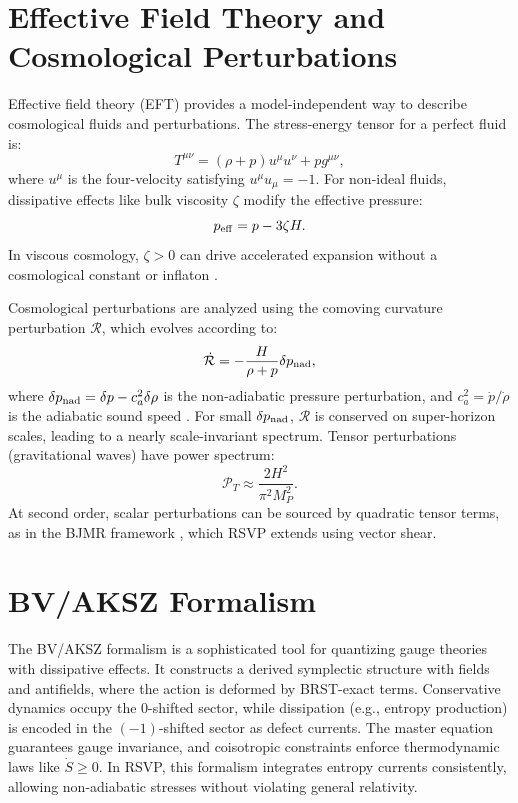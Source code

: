 \documentclass[12pt, a4paper, openany]{book}
\theoremstyle{definition}
\begin{document}
\section{Effective Field Theory and Cosmological Perturbations}
Effective field theory (EFT) provides a model-independent way to describe cosmological fluids and perturbations. The stress-energy tensor for a perfect fluid is:
\begin{equation}
T^{\mu\nu} = (\rho + p)u^\mu u^\nu + p g^{\mu\nu},
\end{equation}
where $u^\mu$ is the four-velocity satisfying $u^\mu u_\mu = -1$. For non-ideal fluids, dissipative effects like bulk viscosity $\zeta$ modify the effective pressure:
\begin{equation}
p_{\rm eff} = p - 3\zeta H.
\end{equation}
In viscous cosmology, $\zeta > 0$ can drive accelerated expansion without a cosmological constant or inflaton \citep{Coley:2009}.

Cosmological perturbations are analyzed using the comoving curvature perturbation $\mathcal{R}$, which evolves according to:
\begin{equation}
\dot{\mathcal{R}} = -\frac{H}{\rho + p} \delta p_{\rm nad},
\end{equation}
where $\delta p_{\rm nad} = \delta p - c_a^2 \delta \rho$ is the non-adiabatic pressure perturbation, and $c_a^2 = \dot{p}/\dot{\rho}$ is the adiabatic sound speed \citep{Malik:2009}. For small $\delta p_{\rm nad}$, $\mathcal{R}$ is conserved on super-horizon scales, leading to a nearly scale-invariant spectrum. Tensor perturbations (gravitational waves) have power spectrum:
\begin{equation}
\mathcal{P}_T \approx \frac{2 H^2}{\pi^2 M_P^2}.
\end{equation}
At second order, scalar perturbations can be sourced by quadratic tensor terms, as in the BJMR framework \citep{Bertacca2024}, which RSVP extends using vector shear.

\section{BV/AKSZ Formalism}
The BV/AKSZ formalism is a sophisticated tool for quantizing gauge theories with dissipative effects. It constructs a derived symplectic structure with fields and antifields, where the action is deformed by BRST-exact terms. Conservative dynamics occupy the 0-shifted sector, while dissipation (e.g., entropy production) is encoded in the $(-1)$-shifted sector as defect currents. The master equation guarantees gauge invariance, and coisotropic constraints enforce thermodynamic laws like $\dot{S} \ge 0$. In RSVP, this formalism integrates entropy currents consistently, allowing non-adiabatic stresses without violating general relativity.
\end{document}
